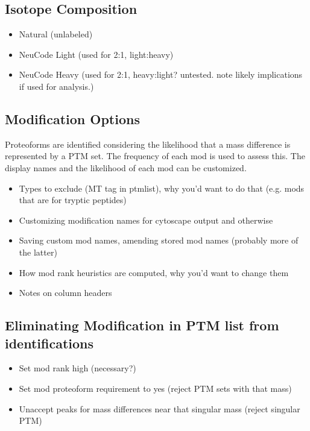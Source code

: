 \subsection{Isotope Composition}
\begin{itemize}
	\item Natural (unlabeled)
	\item NeuCode Light (used for 2:1, light:heavy)
	\item NeuCode Heavy (used for 2:1, heavy:light? untested. note likely implications if used for analysis.)
\end{itemize}

\subsection{Modification Options}
Proteoforms are identified considering the likelihood that a mass difference is represented by a PTM set. The frequency of each mod is used to assess this. The display names and the likelihood of each mod can be customized. 
\begin{itemize}
	\item Types to exclude (MT tag in ptmlist), why you'd want to do that (e.g. mods that are for tryptic peptides)
	\item Customizing modification names for cytoscape output and otherwise
	\item Saving custom mod names, amending stored mod names (probably more of the latter)
	\item How mod rank heuristics are computed, why you'd want to change them
	\item Notes on column headers
\end{itemize}

\subsection{Eliminating Modification in PTM list from identifications}
\begin{itemize}
	\item Set mod rank high (necessary?)
	\item Set mod proteoform requirement to yes (reject PTM sets with that mass)
	\item Unaccept peaks for mass differences near that singular mass (reject singular PTM)
\end{itemize}
